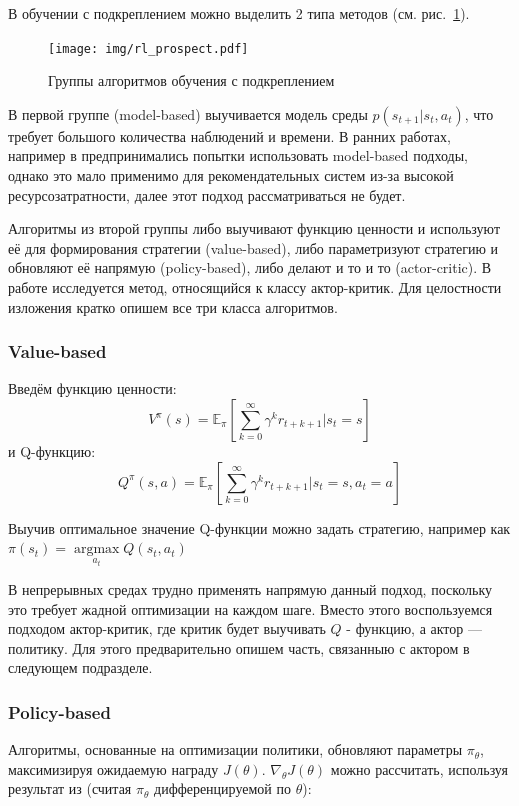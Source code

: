 \documentclass[14pt]{extarticle}
\DeclareMathOperator*{\argmax}{argmax}
\begin{document}
В обучении с подкреплением можно выделить 2 типа методов (см. рис.~\ref{fig:components}).

\begin{figure}[h]
	\centering
	\texttt{[image: img/rl\_prospect.pdf]}
	\caption{Группы алгоритмов обучения с подкреплением}
	\label{fig:components}
\end{figure}

В первой группе (model-based) выучивается модель среды $p(s_{t+1}|s_t, a_t)$, что требует большого количества наблюдений и времени.
В ранних работах, например в \cite{mdp} предпринимались попытки использовать model-based подходы, однако это мало применимо для рекомендательных систем из-за высокой ресурсозатратности, далее этот подход рассматриваться не будет.

Алгоритмы из второй группы либо выучивают функцию ценности и используют её для формирования стратегии (value-based), либо параметризуют стратегию и обновляют её напрямую (policy-based), либо делают и то и то (actor-critic). В работе исследуется метод, относящийся к классу актор-критик. Для целостности изложения кратко опишем все три класса алгоритмов.

\subsubsection{Value-based}
Введём функцию ценности:
$$V^{\pi}(s) = \mathbb{E}_{\pi} \left[ \sum\limits_{k=0}^{\infty} \gamma^k r_{t+k+1} | s_t=s\right]$$
и Q-функцию:
$$Q^{\pi}(s, a) = \mathbb{E}_{\pi} \left[\sum\limits_{k=0}^{\infty} \gamma^k r_{t+k+1} | s_t=s, a_t=a \right]$$

Выучив оптимальное значение Q-функции можно задать стратегию, например как $\pi(s_t) = \argmax\limits_{a_t} Q(s_t, a_t)$

В непрерывных средах трудно применять напрямую данный подход, поскольку это требует жадной оптимизации на каждом шаге.
Вместо этого воспользуемся подходом актор-критик, где критик будет выучивать $Q$ - функцию, а актор --- политику. Для этого предварительно опишем часть, связанныю с актором в следующем подразделе.

\subsubsection{Policy-based}

Алгоритмы, основанные на оптимизации политики, обновляют параметры $\pi_{\theta}$, максимизируя ожидаемую награду $J(\theta)$.
$\nabla_{\theta} J(\theta)$ можно рассчитать, используя результат из \cite{pg} (считая $\pi_{\theta}$ дифференцируемой по $\theta$):
\end{document}
